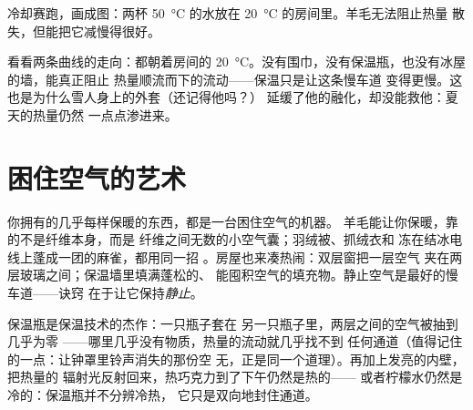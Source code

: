 \begin{omfigure}

{\small 冷却赛跑，画成图：两杯 \qty{50}{\celsius}
的水放在 \qty{20}{\celsius} 的房间里。羊毛无法阻止热量
散失，但能把它减慢得很好。}
\end{omfigure}

\begin{remark}[保温只能减慢]\label{rem:g5:heat-and-insulation:onlyslows}
看看两条曲线的走向：都朝着房间的
\qty{20}{\celsius}。没有围巾，没有保温瓶，也没有冰屋的墙，能真正阻止
热量顺流而下的流动——保温只是让这条慢车道
变得更慢。这也是为什么雪人身上的外套（还记得他吗？）
延缓了他的融化，却没能救他：夏天的热量仍然
一点点渗进来。
\end{remark}

\section{困住空气的艺术}

\begin{example}[冬季工程]\label{ex:g5:heat-and-insulation:air}
你拥有的几乎每样保暖的东西，都是一台困住空气的机器。
羊毛能让你保暖，靠的不是纤维本身，而是
纤维之间无数的小空气囊；羽绒被、抓绒衣和
冻在结冰电线上蓬成一团的麻雀，都用同一招
。房屋也来凑热闹：双层窗把一层空气
夹在两层玻璃之间；保温墙里填满蓬松的、
能囤积空气的填充物。静止空气是最好的慢车道——诀窍
在于让它保持\emph{静止}。
\end{example}

\begin{example}[保温瓶]\label{ex:g5:heat-and-insulation:thermos}
保温瓶是保温技术的杰作：一只瓶子套在
另一只瓶子里，两层之间的空气被抽到几乎为零
——哪里几乎没有物质，热量的流动就几乎找不到
任何通道（值得记住的一点：让钟罩里铃声消失的那份空
无，正是同一个道理）。再加上发亮的内壁，把热量的
辐射光反射回来，热巧克力到了下午仍然是热的——
或者柠檬水仍然是冷的：保温瓶并不分辨冷热，
它只是双向地封住通道。
\end{example}

